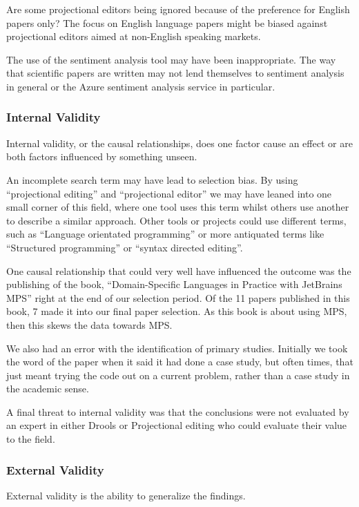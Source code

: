Are some projectional editors being ignored because of the preference for English papers only?
The focus on English language papers might be biased against projectional editors aimed at non-English speaking markets.

The use of the sentiment analysis tool may have been inappropriate.
The way that scientific papers are written may not lend themselves to sentiment analysis in general or the Azure sentiment analysis service in particular.

\subsubsection{Internal Validity}
Internal validity, or the causal relationships, does one factor cause an effect or are both factors influenced by something unseen.

An incomplete search term may have lead to selection bias.  
By using ``projectional editing'' and ``projectional editor'' we may have leaned into one small corner of this field, where one tool uses this term whilst others use another to describe a similar approach.
Other tools or projects could use different terms, such as ``Language orientated programming'' or more antiquated terms like ``Structured programming'' or ``syntax directed editing''.

One causal relationship that could very well have influenced the outcome was the publishing of the book, ``Domain-Specific Languages in Practice with JetBrains MPS'' right at the end of our selection period.
Of the 11 papers published in this book, 7 made it into our final paper selection.
As this book is about using MPS, then this skews the data towards MPS.

We also had an error with the identification of primary studies. 
Initially we took the word of the paper when it said it had done a case study, but often times, that just meant trying the code out on a current problem, rather than a case study in the academic sense.

A final threat to internal validity was that the conclusions were not evaluated by an expert in either Drools or Projectional editing who could evaluate their value to the field.

\subsubsection{External Validity}
External validity is the ability to generalize the findings.

